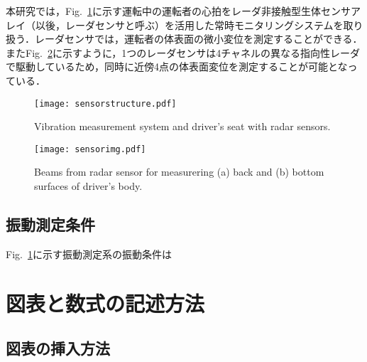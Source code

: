 \documentclass[a4j]{jsarticle}
\begin{document}
本研究では，Fig.~\ref{fig:sensorstructure}に示す運転中の運転者の心拍をレーダ非接触型生体センサアレイ（以後，レーダセンサと呼ぶ）を活用した常時モニタリングシステムを取り扱う．レーダセンサでは，運転者の体表面の微小変位を測定することができる．またFig.~\ref{fig:sensorimg}に示すように，1つのレーダセンサは4チャネルの異なる指向性レーダで駆動しているため，同時に近傍4点の体表面変位を測定することが可能となっている．

\begin{figure}[tb]
  \centering
  \vspace{0pt} %
  \texttt{[image: sensorstructure.pdf]}
  \vspace{0pt} %
  \caption{Vibration measurement system and driver's seat with radar sensors.}
  \vspace{0pt} %
  \label{fig:sensorstructure}
\end{figure}

\begin{figure}[t]
  \centering
  \vspace{0pt} %
  \texttt{[image: sensorimg.pdf]}
  \vspace{0pt} %
  \caption{Beams from radar sensor for measurering (a) back and (b) bottom surfaces of driver's body.}
  \vspace{0pt} %
  \label{fig:sensorimg}
\end{figure}

\subsection{振動測定条件}

Fig.~\ref{fig:sensorstructure}に示す振動測定系の振動条件は

\section{図表と数式の記述方法}

\subsection{図表の挿入方法}
\end{document}
